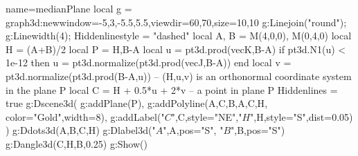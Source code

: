 \documentclass[12pt]{standalone}
\begin{document}
\begin{luadraw}{name=medianPlane}
 local g = graph3d:new{window={-5,3,-5.5,5.5},viewdir={60,70},size={10,10}}
g:Linejoin("round"); g:Linewidth(4); Hiddenlinestyle = "dashed"
local A, B = M(4,0,0), M(0,4,0)
local H = (A+B)/2
local P = {H,B-A}
local u = pt3d.prod(vecK,B-A)
if pt3d.N1(u) < 1e-12 then u = pt3d.normalize(pt3d.prod(vecJ,B-A)) end
local v = pt3d.normalize(pt3d.prod(B-A,u)) -- (H,u,v) is an orthonormal coordinate system in the plane P
local C = H + 0.5*u + 2*v  -- a point in plane P
Hiddenlines = true
g:Dscene3d(
    g:addPlane(P),
    g:addPolyline({{A,C,B,A},{C,H}}, {color="Gold",width=8}),
    g:addLabel("$C$",C,{style="NE"},"$H$",H,{style="S",dist=0.05})
    )
g:Ddots3d({A,B,C,H})
g:Dlabel3d("$A$",A,{pos="S"}, "$B$",B,{pos="S"})
g:Dangle3d(C,H,B,0.25)
g:Show()
\end{luadraw}
\end{document}
